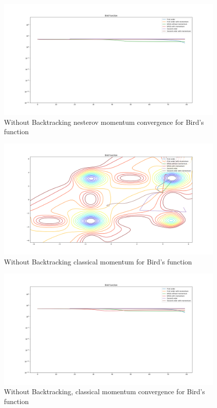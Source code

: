 \documentclass{article}
\begin{document}
\begin{figure}[H]
	\includegraphics[width=\linewidth]{../Images/birdnesterov1.png}
	\caption{Without Backtracking nesterov momentum convergence for Bird's function}
	\label{fig:Without Backtracking nesterov momentum convergence for Bird's function}
\end{figure}

\begin{figure}[H]
	\includegraphics[width=\linewidth]{../Images/birdmomentum.png}
	\caption{Without Backtracking classical momentum for Bird's function}
	\label{fig:Without Backtracking classical momentum for Bird's function}
\end{figure}

\begin{figure}[H]
	\includegraphics[width=\linewidth]{../Images/birdmomentum1.png}
	\caption{Without Backtracking, classical momentum convergence for Bird's function}
	\label{fig:Without Backtracking, classical momentum convergence for Bird's function}
\end{figure}
\end{document}
